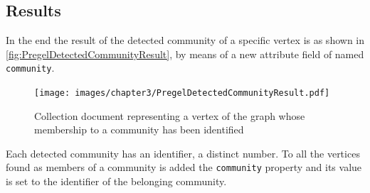 \subsection{Results} \label{subsection:CommunityDetection/ClusteringcollaborationcommunitiesAlgorithmexecution/Results}
In the end the result of the detected community of a specific vertex is as shown in \hyperref[fig:PregelDetectedCommunityResult]{\autoref{fig:PregelDetectedCommunityResult}}, by means of a new attribute field of named \texttt{community}.

\begin{figure}[H]%
	\centering%
	\texttt{[image: images/chapter3/PregelDetectedCommunityResult.pdf]}%
	\caption[Collection document representing a vertex of the graph whose membership to a community has been identified]{Collection document representing a vertex of the graph whose membership to a community has been identified}%
	\label{fig:PregelDetectedCommunityResult}%
\end{figure}%

Each detected community has an identifier, a distinct number.
To all the vertices found as members of a community is added the \texttt{community} property and its value is set to the identifier of the belonging community.

